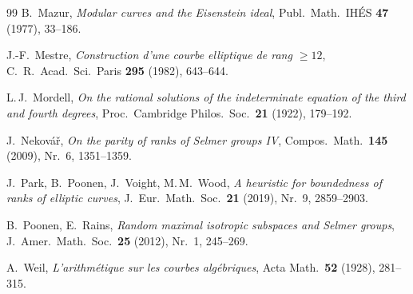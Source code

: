 \documentclass[12pt,a4paper]{amsart}
\theoremstyle{definition}
\theoremstyle{remark}
\begin{document}
\begin{thebibliography}{99}
B.\ Mazur,
\textit{Modular curves and the Eisenstein ideal},
Publ.\ Math.\ IHÉS \textbf{47} (1977), 33--186.

J.-F.\ Mestre,
\textit{Construction d'une courbe elliptique de rang $\geq 12$},
C.\ R.\ Acad.\ Sci.\ Paris \textbf{295} (1982), 643--644.

L.\,J.\ Mordell,
\textit{On the rational solutions of the indeterminate equation of the third and fourth degrees},
Proc.\ Cambridge Philos.\ Soc.\ \textbf{21} (1922), 179--192.

J.\ Nekovář,
\textit{On the parity of ranks of Selmer groups IV},
Compos.\ Math.\ \textbf{145} (2009), Nr.\ 6, 1351--1359.

J.\ Park, B.\ Poonen, J.\ Voight, M.\,M.\ Wood,
\textit{A heuristic for boundedness of ranks of elliptic curves},
J.\ Eur.\ Math.\ Soc.\ \textbf{21} (2019), Nr.\ 9, 2859--2903.

B.\ Poonen, E.\ Rains,
\textit{Random maximal isotropic subspaces and Selmer groups},
J.\ Amer.\ Math.\ Soc.\ \textbf{25} (2012), Nr.\ 1, 245--269.

A.\ Weil,
\textit{L'arithmétique sur les courbes algébriques},
Acta Math.\ \textbf{52} (1928), 281--315.

\end{thebibliography}
\end{document}
